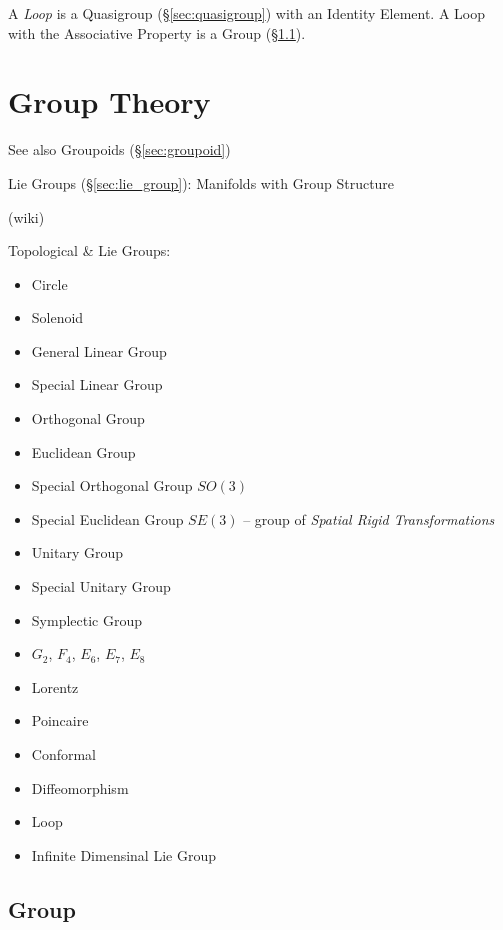 A \emph{Loop} is a Quasigroup (\S\ref{sec:quasigroup}) with an
Identity Element. A Loop with the Associative Property is a Group
(\S\ref{sec:group}).



\section{Group Theory}\label{sec:group_theory}

\fist See also Groupoids (\S\ref{sec:groupoid})

\fist Lie Groups (\S\ref{sec:lie_group}): Manifolds with Group Structure

(wiki)

Topological \& Lie Groups:
\begin{itemize}
  \item Circle
  \item Solenoid
  \item General Linear Group
  \item Special Linear Group
  \item Orthogonal Group
  \item Euclidean Group
  \item Special Orthogonal Group $SO(3)$
  \item Special Euclidean Group $SE(3)$ -- group of \emph{Spatial Rigid
    Transformations}
  \item Unitary Group
  \item Special Unitary Group
  \item Symplectic Group
  \item $G_2$, $F_4$, $E_6$, $E_7$, $E_8$
  \item Lorentz
  \item Poincaire
  \item Conformal
  \item Diffeomorphism
  \item Loop
  \item Infinite Dimensinal Lie Group
\end{itemize}




\subsection{Group}\label{sec:group}


